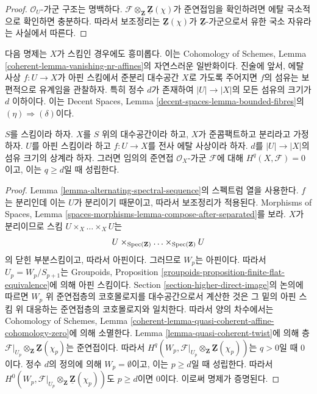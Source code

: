 \begin{proof}
$\mathcal{O}_U$-가군 구조는 명백하다.
$\mathcal{F} \otimes_{\mathbf{Z}} \underline{\mathbf{Z}}(\chi)$가
준연접임을 확인하려면 에탈 국소적으로 확인하면 충분하다.
따라서 보조정리는 $\underline{\mathbf{Z}}(\chi)$가
$\underline{\mathbf{Z}}$-가군으로서 유한 국소 자유라는 사실에서 따른다.
\end{proof}

\noindent
다음 명제는 $X$가 스킴인 경우에도 흥미롭다. 이는 Cohomology of Schemes,
Lemma \ref{coherent-lemma-vanishing-nr-affines}의 자연스러운 일반화이다.
진술에 앞서, 에탈 사상 $f : U \to X$가 아핀 스킴에서 준분리
대수공간 $X$로 가도록 주어지면 $f$의 섬유는 보편적으로 유계임을
관찰하자.
특히 정수 $d$가 존재하여 $|U| \to |X|$의 모든 섬유의 크기가
$d$ 이하이다. 이는 Decent Spaces, Lemma
\ref{decent-spaces-lemma-bounded-fibres}의
$(\eta) \Rightarrow (\delta)$이다.

\begin{proposition}
\label{proposition-vanishing}
$S$를 스킴이라 하자. $X$를 $S$ 위의 대수공간이라 하고,
$X$가 준콤팩트하고 분리라고 가정하자. $U$를 아핀 스킴이라 하고
$f : U \to X$를 전사 에탈 사상이라 하자. $d$를
$|U| \to |X|$의 섬유 크기의 상계라 하자. 그러면 임의의 준연접
$\mathcal{O}_X$-가군 $\mathcal{F}$에 대해
$H^q(X, \mathcal{F}) = 0$이고, 이는 $q \geq d$일 때 성립한다.
\end{proposition}

\begin{proof}
Lemma \ref{lemma-alternating-spectral-sequence}의 스펙트럼 열을 사용한다.
$f$는 분리인데 이는 $U$가 분리이기 때문이고, 따라서 보조정리가 적용된다.
Morphisms of Spaces, Lemma
\ref{spaces-morphisms-lemma-compose-after-separated}를 보라.
$X$가 분리이므로 스킴 $U \times_X \ldots \times_X U$는
$$
U \times_{\mathop{\mathrm{Spec}}(\mathbf{Z})} \ldots \times_{\mathop{\mathrm{Spec}}(\mathbf{Z})} U
$$
의 닫힌 부분스킴이고, 따라서 아핀이다. 그러므로 $W_p$는 아핀이다.
따라서 $U_p = W_p/S_{p + 1}$는 Groupoids, Proposition
\ref{groupoids-proposition-finite-flat-equivalence}에 의해 아핀 스킴이다.
Section \ref{section-higher-direct-image}의 논의에 따르면
$W_p$ 위 준연접층의 코호몰로지를 대수공간으로서 계산한 것은
그 밑의 아핀 스킴 위 대응하는 준연접층의 코호몰로지와 일치한다.
따라서 양의 차수에서는 Cohomology of Schemes, Lemma
\ref{coherent-lemma-quasi-coherent-affine-cohomology-zero}에 의해 소멸한다.
Lemma \ref{lemma-quasi-coherent-twist}에 의해 층
$\mathcal{F}|_{U_p} \otimes_\mathbf{Z} \underline{\mathbf{Z}}(\chi_p)$는
준연접이다. 따라서
$H^q(W_p,
\mathcal{F}|_{U_p} \otimes_\mathbf{Z} \underline{\mathbf{Z}}(\chi_p))$는
$q > 0$일 때 0이다. 정수 $d$의 정의에 의해
$W_p = \emptyset$이고, 이는 $p \geq d$일 때 성립한다. 따라서
$H^0(W_p,
\mathcal{F}|_{U_p} \otimes_\mathbf{Z} \underline{\mathbf{Z}}(\chi_p))$도
$p \geq d$이면 0이다. 이로써 명제가 증명된다.
\end{proof}


